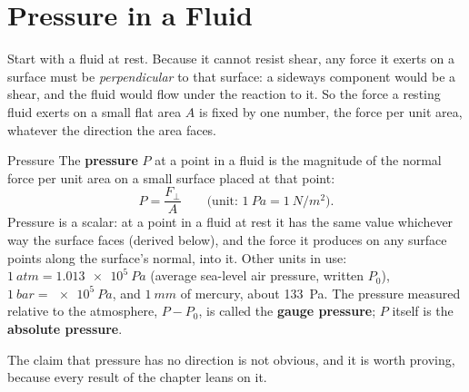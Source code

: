 \section{Pressure in a Fluid}\label{sec:fluid-pressure}

Start with a fluid at rest. Because it cannot resist shear, any force it exerts on a surface must be
\emph{perpendicular} to that surface: a sideways component would be a shear, and the fluid would flow under
the reaction to it. So the force a resting fluid exerts on a small flat area $A$ is fixed by one number, the
force per unit area, whatever the direction the area faces.

\begin{defbox}{Pressure}
The \textbf{pressure} $P$ at a point in a fluid is the magnitude of the normal force per unit area on a
small surface placed at that point:
\[
P=\frac{F_\perp}{A}\qquad\big(\text{unit: }\SI{1}{Pa}=\SI{1}{N/m^2}\big).
\]
Pressure is a scalar: at a point in a fluid at rest it has the same value whichever way the surface faces
(derived below), and the force it produces on any surface points along the surface's normal, into it.
Other units in use: $\SI{1}{atm}=\SI{1.013e5}{Pa}$ (average sea-level air pressure, written $P_0$),
$\SI{1}{bar}=\SI{e5}{Pa}$, and $\SI{1}{mm}$ of mercury, about \SI{133}{Pa}. The pressure measured
relative to the atmosphere, $P-P_0$, is called the \textbf{gauge pressure}; $P$ itself is the
\textbf{absolute pressure}.
\end{defbox}

The claim that pressure has no direction is not obvious, and it is worth proving, because every result
of the chapter leans on it.

